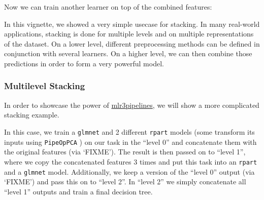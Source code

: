 \documentclass[
  11pt,
  parskip=half,
  DIV=calc,
  BCOR=10mm,
  x11names]{scrbook}
\newenvironment{Shaded}{}{}
\newcommand{\CommentTok}[1]{\textcolor[rgb]{0.00,0.50,0.00}{#1}}
\newcommand{\DataTypeTok}[1]{#1}
\newcommand{\KeywordTok}[1]{\textcolor[rgb]{0.00,0.00,1.00}{#1}}
\newcommand{\NormalTok}[1]{#1}
\newcommand{\OperatorTok}[1]{#1}
\newcommand{\OtherTok}[1]{\textcolor[rgb]{1.00,0.25,0.00}{#1}}
\newcommand{\StringTok}[1]{\textcolor[rgb]{0.00,0.50,0.50}{#1}}
\begin{document}
Now we can train another learner on top of the combined features:

\begin{Shaded}
\end{Shaded}

\begin{Shaded}
\end{Shaded}

In this vignette, we showed a very simple usecase for stacking.
In many real-world applications, stacking is done for multiple levels and on multiple representations of the dataset.
On a lower level, different preprocessing methods can be defined in conjunction with several learners.
On a higher level, we can then combine those predictions in order to form a very powerful model.

\hypertarget{multilevel-stacking}{%
\subsubsection{Multilevel Stacking}\label{multilevel-stacking}}

In order to showcase the power of \href{https://mlr3pipelines.mlr-org.com}{mlr3pipelines}, we will show a more complicated stacking example.

In this case, we train a \texttt{glmnet} and 2 different \texttt{rpart} models (some transform its inputs using \texttt{PipeOpPCA} ) on our task in the ``level 0'' and concatenate them with the original features (via `FIXME').
The result is then passed on to ``level 1'', where we copy the concatenated features 3 times and put this task into an \texttt{rpart} and a \texttt{glmnet} model.
Additionally, we keep a version of the ``level 0'' output (via `FIXME') and pass this on to ``level 2''.
In ``level 2'' we simply concatenate all ``level 1'' outputs and train a final decision tree.
\end{document}
